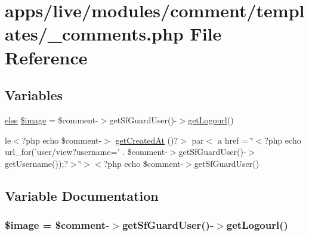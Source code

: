 \hypertarget{live_2modules_2comment_2templates_2__comments_8php}{\section{apps/live/modules/comment/templates/\-\_\-comments.php File Reference}
\label{live_2modules_2comment_2templates_2__comments_8php}
}
\subsection*{Variables}
\begin{DoxyCompactItemize}
\item 
\hyperlink{live_2modules_2team_2templates_2management_success_8php_a0544c3fe466e421738dae463968b70ba}{else} \hyperlink{live_2modules_2comment_2templates_2__comments_8php_ad6ae3032a6e108277018579e7b89376d}{\$image} = \$comment-\/$>$get\-Sf\-Guard\-User()-\/$>$\hyperlink{backend_2modules_2tournament_2templates_2index_success_8php_a35941bec2f3cf7beef9b8010a1342325}{get\-Logourl}()
\item 
le$<$?php echo \$comment-\/$>$ \hyperlink{live_2modules_2comment_2templates_2__comments_8php_a4dd7f607c7b5683f1ebb8f4b4260ec6d}{get\-Created\-At} ()?$>$ par$<$ a href = \char`\"{}$<$?php echo url\-\_\-for('user/view?username=' . \$comment-\/$>$get\-Sf\-Guard\-User()-\/$>$get\-Username());?$>$\char`\"{}$>$$<$?php echo \$comment-\/$>$get\-Sf\-Guard\-User()
\end{DoxyCompactItemize}


\subsection{Variable Documentation}
\hypertarget{live_2modules_2comment_2templates_2__comments_8php_ad6ae3032a6e108277018579e7b89376d}{
\subsubsection[{\$image}]{ \$image = \$comment-\/$>$get\-Sf\-Guard\-User()-\/$>${\bf get\-Logourl}()}}\label{live_2modules_2comment_2templates_2__comments_8php_ad6ae3032a6e108277018579e7b89376d}


